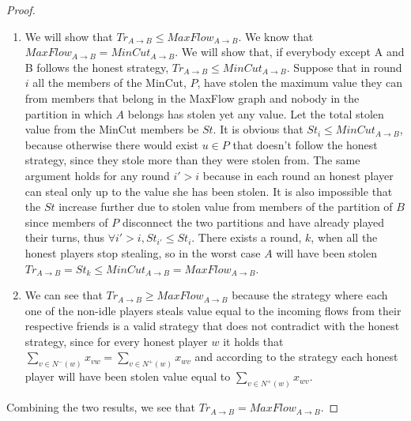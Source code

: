 \documentclass[11pt]{article}
\theoremstyle{definition}
\theoremstyle{corollary}
\begin{document}
    \begin{proof} \
        \begin{enumerate}
	   \item We will show that $Tr_{A \rightarrow B} \leq MaxFlow_{A \rightarrow B}$.
           We know that $MaxFlow_{A \rightarrow B} = MinCut_{A \rightarrow B}$. We will show that, if everybody except
           A and B follows the honest strategy,  $Tr_{A \rightarrow B} \leq MinCut_{A \rightarrow B}$. Suppose that in
           round $i$ all the members of the MinCut, $P$, have stolen the maximum value they can from members that belong
           in the MaxFlow graph and nobody in the partition in which $A$ belongs has stolen yet any value. Let the total
           stolen value from the MinCut members be $St$. It is obvious that $St_i \leq MinCut_{A \rightarrow B}$, because
           otherwise there would exist $u \in P$ that doesn't follow the honest strategy, since they stole more than they
           were stolen from. The same argument holds for any round $i' > i$ because in each round an honest player can
           steal only up to the value she has been stolen. It is also impossible that the $St$ increase further due to
           stolen value from members of the partition of $B$ since members of $P$ disconnect the two partitions and have
           already played their turns, thus $\forall i' > i, St_{i'} \leq St_i$. There exists a round, $k$, when all the
           honest players stop stealing, so in the worst case $A$ will have been stolen
           $Tr_{A \rightarrow B} = St_k \leq MinCut_{A \rightarrow B} = MaxFlow_{A \rightarrow B}$.
           \item We can see that $Tr_{A \rightarrow B} \geq MaxFlow_{A \rightarrow B}$ because the strategy where each
           one of the non-idle players steals value equal to the incoming flows from their respective friends is a valid
           strategy that does not contradict with the honest strategy, since for every honest player $w$ it holds that
           $\sum\limits_{v \in N^{-}(w)}x_{vw} = \sum\limits_{v \in N^{+}(w)}x_{wv}$ and according to the strategy each
           honest player will have been stolen value equal to $\sum\limits_{v \in N^{+}(w)}x_{wv}$.
        \end{enumerate}
        Combining the two results, we see that $Tr_{A \rightarrow B} = MaxFlow_{A \rightarrow B}$.

\end{proof}
\end{document}
